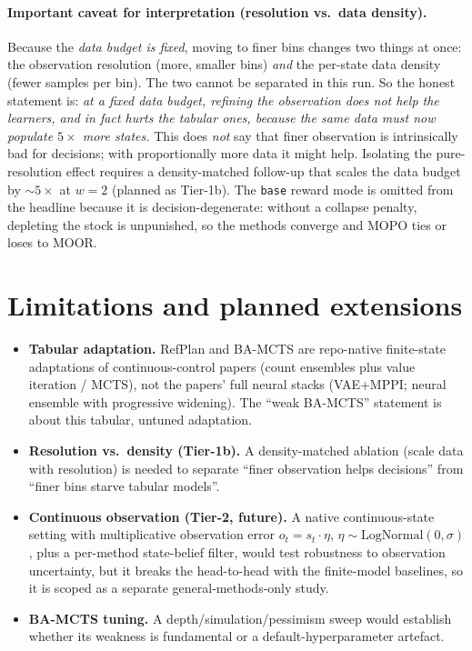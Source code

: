 \documentclass[11pt]{article}
\begin{document}
\paragraph{Important caveat for interpretation (resolution vs.\ data density).} Because the
\emph{data budget is fixed}, moving to finer bins changes two things at once: the
observation resolution (more, smaller bins) \emph{and} the per-state data density (fewer
samples per bin). The two cannot be separated in this run. So the honest statement is:
\emph{at a fixed data budget, refining the observation does not help the learners, and in
fact hurts the tabular ones, because the same data must now populate $5\times$ more
states.} This does \emph{not} say that finer observation is intrinsically bad for
decisions; with proportionally more data it might help. Isolating the pure-resolution
effect requires a density-matched follow-up that scales the data budget by $\sim 5\times$
at $w=2$ (planned as Tier-1b). The \texttt{base} reward mode is omitted from the headline
because it is decision-degenerate: without a collapse penalty, depleting the stock is
unpunished, so the methods converge and MOPO ties or loses to MOOR.

\section{Limitations and planned extensions}
\begin{itemize}
\item \textbf{Tabular adaptation.} RefPlan and BA-MCTS are repo-native finite-state
adaptations of continuous-control papers (count ensembles plus value iteration / MCTS),
not the papers' full neural stacks (VAE+MPPI; neural ensemble with progressive widening).
The ``weak BA-MCTS'' statement is about this tabular, untuned adaptation.
\item \textbf{Resolution vs.\ density (Tier-1b).} A density-matched ablation (scale data
with resolution) is needed to separate ``finer observation helps decisions'' from ``finer
bins starve tabular models''.
\item \textbf{Continuous observation (Tier-2, future).} A native continuous-state setting
with multiplicative observation error $o_t = s_t\cdot\eta$,
$\eta\sim\mathrm{LogNormal}(0,\sigma)$, plus a per-method state-belief filter, would test
robustness to observation uncertainty, but it breaks the head-to-head with the
finite-model baselines, so it is scoped as a separate general-methods-only study.
\item \textbf{BA-MCTS tuning.} A depth/simulation/pessimism sweep would establish whether
its weakness is fundamental or a default-hyperparameter artefact.
\end{itemize}
\end{document}
